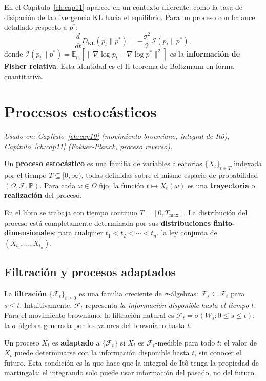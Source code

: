En el Capítulo~\ref{ch:cap11} aparece en un contexto diferente: como la tasa de
disipación de la divergencia KL hacia el equilibrio. Para un proceso con balance
detallado respecto a $p^*$:
\[
  \frac{d}{dt}D_{\mathrm{KL}}(p_t\|p^*)
  = -\frac{\sigma^2}{2}\,\mathcal{I}(p_t\|p^*),
\]
donde $\mathcal{I}(p_t\|p^*) = \mathbb{E}_{p_t}[\|\nabla\log p_t -
\nabla\log p^*\|^2]$ es la \textbf{información de Fisher relativa}. Esta
identidad es el H-teorema de Boltzmann en forma cuantitativa.

\section{Procesos estocásticos}
\label{sec:ap_procesos}

\textit{Usado en: Capítulo~\ref{ch:cap10} (movimiento browniano, integral de
Itô), Capítulo~\ref{ch:cap11} (Fokker-Planck, proceso reverso).}

\medskip
Un \textbf{proceso estocástico} es una familia de variables aleatorias
$\{X_t\}_{t\in T}$ indexada por el tiempo $T\subseteq[0,\infty)$, todas
definidas sobre el mismo espacio de probabilidad $(\Omega,\mathcal{F},\mathbb{P})$.
Para cada $\omega\in\Omega$ fijo, la función $t\mapsto X_t(\omega)$ es una
\textbf{trayectoria} o \textbf{realización} del proceso.

En el libro se trabaja con tiempo continuo $T=[0,T_{\max}]$. La distribución
del proceso está completamente determinada por sus
\textbf{distribuciones finito-dimensionales}: para cualquier
$t_1 < t_2 < \cdots < t_n$, la ley conjunta de $(X_{t_1},\ldots,X_{t_n})$.

\subsection{Filtración y procesos adaptados}
\label{subsec:ap_filtracion}

La \textbf{filtración} $\{\mathcal{F}_t\}_{t\geq 0}$ es una familia creciente
de $\sigma$-álgebras: $\mathcal{F}_s \subseteq \mathcal{F}_t$ para $s \leq t$.
Intuitivamente, $\mathcal{F}_t$ representa \emph{la información disponible hasta
el tiempo $t$}. Para el movimiento browniano, la filtración natural es
$\mathcal{F}_t = \sigma(W_s : 0 \leq s \leq t)$: la $\sigma$-álgebra generada
por los valores del browniano hasta $t$.

Un proceso $X_t$ es \textbf{adaptado} a $\{\mathcal{F}_t\}$ si $X_t$ es
$\mathcal{F}_t$-medible para todo $t$: el valor de $X_t$ puede determinarse
con la información disponible hasta $t$, sin conocer el futuro. Esta condición
es la que hace que la integral de Itô tenga la propiedad de martingala: el
integrando solo puede usar información del pasado, no del futuro.

